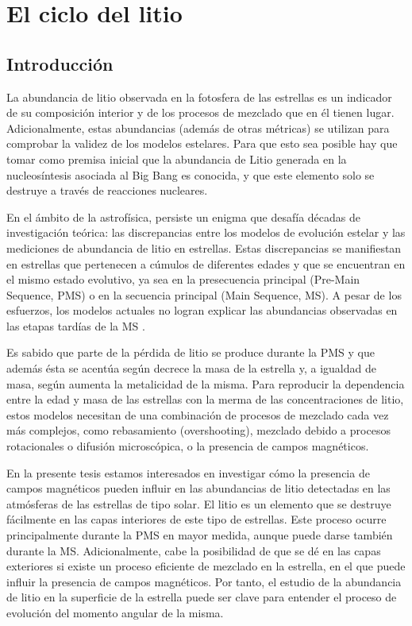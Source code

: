 
\chapter{El ciclo del litio}\label{ch:segundo-capitulo}

\section{Introducción}
La abundancia de litio observada en la fotosfera de las estrellas es un indicador de su composición interior y de los procesos de mezclado que en él tienen lugar. Adicionalmente, estas abundancias (además de otras métricas) se utilizan para comprobar la validez de los modelos estelares. Para que esto sea posible hay que tomar como premisa inicial que la abundancia de Litio generada en la nucleosíntesis asociada al Big Bang es conocida, y que este elemento solo se destruye a través de reacciones nucleares.\par 

En el ámbito de la astrofísica, persiste un enigma que desafía décadas de investigación teórica: las discrepancias entre los modelos de evolución estelar y las mediciones de abundancia de litio en estrellas. Estas discrepancias se manifiestan en estrellas que pertenecen a cúmulos de diferentes edades y que se encuentran en el mismo estado evolutivo, ya sea en la presecuencia principal (Pre-Main Sequence, PMS) o en la secuencia principal (Main Sequence, MS). A pesar de los esfuerzos, los modelos actuales no logran explicar las abundancias observadas en las etapas tardías de la MS \citep{Tschape2001}.\par

Es sabido que parte de la pérdida de litio se produce durante la PMS y que además ésta se acentúa según decrece la masa de la estrella y, a igualdad de masa, según aumenta la metalicidad de la misma. Para reproducir la dependencia entre la edad y masa de las estrellas con la merma de las concentraciones de litio, estos modelos necesitan de una combinación de procesos de mezclado cada vez más complejos, como rebasamiento (overshooting), mezclado debido a procesos rotacionales o difusión microscópica, o la presencia de campos magnéticos.\par

En la presente tesis estamos interesados en investigar cómo la presencia de campos magnéticos pueden influir en las abundancias de litio detectadas en las atmósferas de las estrellas de tipo solar. El litio es un elemento que se destruye fácilmente en las capas interiores de este tipo de estrellas. Este proceso ocurre principalmente durante la PMS en mayor medida, aunque puede darse también durante la MS. Adicionalmente, cabe la posibilidad de que se dé en las capas exteriores si existe un proceso eficiente de mezclado en la estrella, en el que puede influir la presencia de campos magnéticos. Por tanto, el estudio de la abundancia de litio en la superficie de la estrella puede ser clave para entender el proceso de evolución del momento angular de la misma.\par

